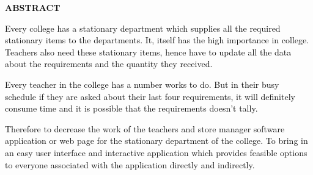 \documentclass[12pt]{report}
\renewcommand{\_}{\kern-1.5pt\textunderscore\kern-1.5pt}
\begin{document}
\vspace{\baselineskip}

\vspace{\baselineskip}

\vspace{\baselineskip}

\vspace{\baselineskip}

\vspace{\baselineskip}

\vspace{\baselineskip}
\begin{adjustwidth}{0.2in}{0.84in}
\begin{Center}
{\fontsize{22pt}{26.4pt}\selectfont \textbf{\textcolor[HTML]{0D0D0D}{ABSTRACT}}\par}
\end{Center}\par

\end{adjustwidth}


\vspace{\baselineskip}

\vspace{\baselineskip}
\begin{adjustwidth}{0.2in}{0.84in}
\textcolor[HTML]{0D0D0D}{Every college has a stationary department which supplies all the required stationary items to the departments. It, itself has the high importance in college. Teachers also need these stationary items, hence have to update all the data about the requirements and the quantity they received.}\par

\end{adjustwidth}

\begin{adjustwidth}{0.2in}{0.84in}
\textcolor[HTML]{0D0D0D}{Every teacher in the college has a number works to do. But in their busy schedule if they are asked about their last four requirements, it will definitely consume time and it is possible that the requirements doesn’t tally.}\par

\end{adjustwidth}

\begin{adjustwidth}{0.2in}{0.84in}
\textcolor[HTML]{0D0D0D}{Therefore to decrease the work of the teachers and store manager software application or web page for the stationary department of the college. To bring in an easy user interface and interactive application which provides feasible options to everyone associated with the application directly and indirectly. }\par

\end{adjustwidth}
\end{document}
